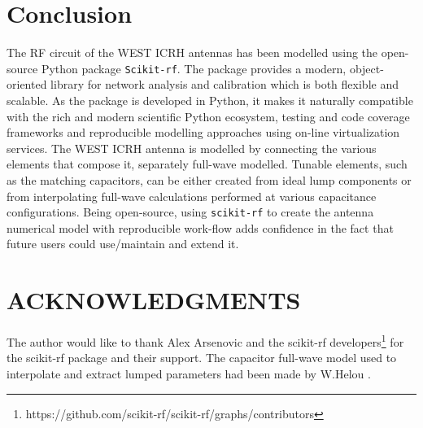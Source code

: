 \documentclass{aip-cp}
\begin{document}
	\section{Conclusion}
	The RF circuit of the WEST ICRH antennas has been modelled using the open-source Python package \texttt{Scikit-rf}. The package provides a modern, object-oriented library for network analysis and calibration which is both flexible and scalable. As the package is developed in Python, it makes it naturally compatible with the rich and modern scientific Python ecosystem, testing and code coverage frameworks and reproducible modelling approaches using on-line virtualization services. The WEST ICRH antenna is modelled by connecting the various elements that compose it, separately full-wave modelled. Tunable elements, such as the matching capacitors, can be either created from ideal lump components or from interpolating full-wave calculations performed at various capacitance configurations. Being open-source, using \texttt{scikit-rf} to create the antenna numerical model with reproducible work-flow adds confidence in the fact that future users could use/maintain and extend it.
	
	
	\section{ACKNOWLEDGMENTS}
	The author would like to thank Alex Arsenovic and the  scikit-rf developers\footnote{https://github.com/scikit-rf/scikit-rf/graphs/contributors} for the scikit-rf package and their support. The capacitor full-wave model used to interpolate and extract lumped parameters had been made by W.Helou \cite{Helou2018_PhD}.
	
	
	
\end{document}
